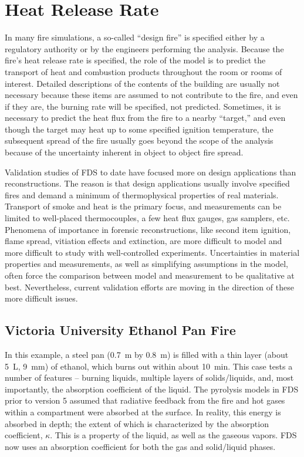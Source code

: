 
\chapter{Heat Release Rate}

In many fire simulations, a  so-called  ``design  fire'' is  specified
either by  a regulatory authority  or by the engineers  performing the
analysis. Because the  fire's heat release rate is  specified, the role of
the model is to predict  the transport of heat and combustion products
throughout  the room or  rooms of  interest. Detailed  descriptions of  the
contents of the building are usually not necessary because these items
are assumed to not contribute to the fire,  and even if they are, the burning rate
will be specified, not predicted.  Sometimes, it is necessary  to predict
the heat  flux from the fire  to a nearby ``target,''  and even though
the target  may heat up  to some specified ignition  temperature, the
subsequent spread  of the  fire usually goes  beyond the scope  of the
analysis because of the uncertainty  inherent in object to object fire
spread.

Validation  studies  of FDS  to  date  have  focused more  on  design
applications   than  reconstructions.  The   reason  is   that  design
applications usually involve specified  fires and demand a minimum of
thermophysical properties  of real materials.  Transport  of smoke and
heat  is  the  primary  focus,  and measurements  can  be  limited  to
well-placed thermocouples, a few  heat flux gauges, gas samplers,
etc. Phenomena of importance in forensic reconstructions, like second
item  ignition, flame  spread, vitiation  effects and  extinction, are
more   difficult  to   model  and   more  difficult   to   study  with
well-controlled experiments. Uncertainties  in material properties and
measurements, as  well as simplifying assumptions in  the model, often
force the  comparison between model and measurement  to be qualitative
at best.  Nevertheless, current validation  efforts are moving  in the
direction of these more difficult issues.



\section{Victoria University Ethanol Pan Fire}
\label{ethanol_pan}

In this example, a steel pan (0.7~m by 0.8~m) is filled with a thin layer (about 5~L, 9~mm) of ethanol, which burns out within about 10~min. This case tests a number of features -- burning
liquids, multiple layers of solids/liquids, and, most importantly, the absorption coefficient of the liquid. The pyrolysis models in FDS prior to version 5
assumed that radiative feedback from the fire and hot gases within a compartment were absorbed at the surface. In reality, this energy is absorbed in
depth; the extent of which is characterized by the absorption coefficient, $\kappa$. This is a property of the liquid, as well as the gaseous vapors. FDS now uses
an absorption coefficient for both the gas and solid/liquid phases. 

